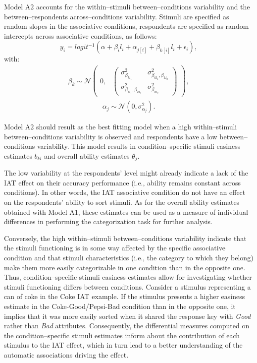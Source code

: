 \documentclass{book}
\begin{document}
Model A2 accounts for the within--stimuli between--conditions variability and the between--respondents across--conditions variability. Stimuli are specified as random slopes in the associative conditions, respondents are specified as random intercepts across associative conditions, as follows: 
%
\begin{equation}\label{Accuracy2}
	y_{i} = logit^{-1}(\alpha + \beta_il_i + \alpha_{j[i]} +  \beta_{k[i]}l_{i} + \epsilon_{i}),
\end{equation}
with:
\begin{align}
	\beta_{k} \sim  \mathcal{N}
	\begin{pmatrix}
		0,&
		\begin{pmatrix}
			\sigma_{\beta_{kl_1}}^2 & \sigma_{\beta_ {kl_1}, \beta_{kl_2}}^2 \\
			\sigma_{{\beta_{kl_1}}, \beta_{kl_2}}^2& \sigma_{\beta_{kl_2}}^2
		\end{pmatrix}
	\end{pmatrix},
\end{align}
\begin{align}
	\alpha_{j} \sim  \mathcal{N} (0, \sigma_{\alpha_j}^2). 
\end{align}

Model A2 should result as the best fitting model when a high within--stimuli between--conditions variability is observed and respondents have a low between--conditions variability. This model results in condition--specific stimuli easiness estimates $b_{kl}$ and overall ability estimates $\theta_{j}$.

The low variability at the respondents' level might already indicate a lack of the IAT effect on their accuracy performance (i.e., ability remains constant across conditions). In other words, the IAT associative condition do not have an effect on the respondents' ability to sort stimuli. As for the overall ability estimates obtained with Model A1, these estimates can be used as a measure of individual differences in performing the categorization task for further analysis.

Conversely, the high within--stimuli between--conditions variability indicate that the stimuli functioning is in some way affected by the specific associative condition and that stimuli characteristics (i.e., the category to which they belong) make them more easily categorizable in one condition than in the opposite one. Thus, condition--specific stimuli easiness estimates allow for investigating whether stimuli functioning differs between conditions. 
Consider a stimulus representing a can of coke in the Coke IAT example. If the stimulus presents a higher easiness estimate in the Coke-Good/Pepsi-Bad condition than in the opposite one, it implies that it was more easily sorted when it shared the response key with \emph{Good} rather than \emph{Bad} attributes. Consequently, the differential measures computed on the condition--specific stimuli estimates inform about the contribution of each stimulus to the IAT effect, which in turn lead to a better understanding of the automatic associations driving the effect. 
\end{document}
